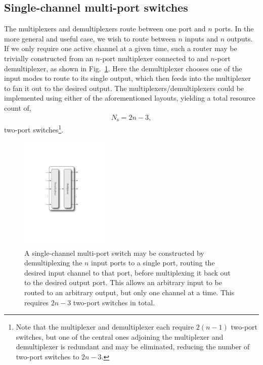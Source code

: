 %
%

\subsection{Single-channel multi-port switches} 

The multiplexers and demultiplexers route between one port and $n$ ports. In the more general and useful case, we wish to route between $n$ inputs and $n$ outputs. If we only require one active channel at a given time, such a router may be trivially constructed from an $n$-port multiplexer connected to and $n$-port demultiplexer, as shown in Fig.~\ref{fig:single_channel_multi_port_switch}. Here the demultiplexer chooses one of the input modes to route to its single output, which then feeds into the multiplexer to fan it out to the desired output. The multiplexers/demultiplexers could be implemented using either of the aforementioned layouts, yielding a total resource count of,
\begin{align}
	N_\mathrm{s} = 2n-3,
\end{align}
two-port switches\footnote{Note that the multiplexer and demultiplexer each require \mbox{$2(n-1)$} two-port switches, but one of the central ones adjoining the multiplexer and demultiplexer is redundant and may be eliminated, reducing the number of two-port switches to \mbox{$2n-3$}.}.

\begin{figure}[!htbp]
\includegraphics[clip=true, width=0.375\textwidth]{single_channel_multi_port_switch}
\captionspacefig \caption{A single-channel multi-port switch may be constructed by demultiplexing the $n$ input ports to a single port, routing the desired input channel to that port, before multiplexing it back out to the desired output port. This allows an arbitrary input to be routed to an arbitrary output, but only one channel at a time. This requires \mbox{$2n-3$} two-port switches in total.} \label{fig:single_channel_multi_port_switch} 	
\end{figure}

